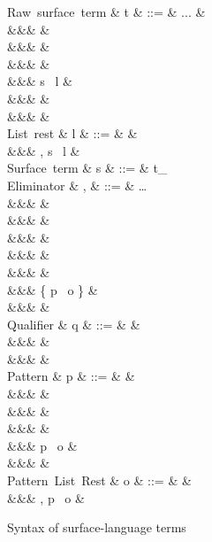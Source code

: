 \begin{figure}[H]
\begin{syntaxfig}
\mbox{Raw surface term}
&
t
&
::=
&
...
&
\\
&&&
&
\\
&&&
&
\\
&&&
\sExNil
&
\\
&&&
\kw{\lbrack}s \ l
&
\\
&&&
&
\\
&&&
&
\\[2mm]

\mbox{List rest}
&
l
&
::=
&
\rbrack
&
\\
&&&
, s \ l
&
\\[2mm]

\mbox{Surface term}
&
s
&
::=
&
t_{\alpha}
\\[2mm]

\mbox{Eliminator}
&
\sigma, \tau
&
::=
&
\ldots
\\
&&&
\elimBoolTrue{\kappa}
&
\\
&&&
\elimBoolFalse{\kappa}
&
\\
&&&
\elimListSingleton{\branchNil{\kappa}}
&
\\
&&&
\elimListSingleton{\branchCons{\sigma}}
&
\\
&&&
\branchEList{\sigma}
&
\\
&&&
\{ \lbrack p \ o \mapsto \sigma \}
&
\\
&&&
&
\\[2mm]

\mbox{Qualifier}
&
q
&
::=
&
&
\\
&&&
&
\\
&&&
&
\\[2mm]


\mbox{Pattern}
&
p
&
::=
&
&
\\
&&&
\pattNil
&
\\
&&&
&
\\
&&&
\pattSNil
&
\\
&&&
\lbrack p \ o
&
\\
&&&
&
\\[2mm]

\mbox{Pattern List Rest}
&
o
&
::=
&
\rbrack
&
\\
&&&
, p \ o
&
\\[2mm]
\end{syntaxfig}
\caption{Syntax of surface-language terms}
\end{figure}


